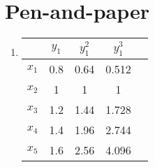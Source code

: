 \documentclass[12pt,a4paper]{article}
\begin{document}
\section{Pen-and-paper}
\begin{enumerate}
	\item
	      \begin{tabular}[t]{|c|c|c|c|c|}
	      	\hline
	      	      & $y_1$ & $y_1^2$ & $y_1^3$ \\
	      	\hline
	      	$x_1$ & 0.8   & 0.64    & 0.512   \\
	      	\hline
	      	$x_2$ & 1     & 1       & 1       \\
	      	\hline
	      	$x_3$ & 1.2   & 1.44    & 1.728   \\
	      	\hline
	      	$x_4$ & 1.4   & 1.96    & 2.744   \\
	      	\hline
	      	$x_5$ & 1.6   & 2.56    & 4.096   \\
	      	\hline
	      \end{tabular}


\end{enumerate}
\end{document}
